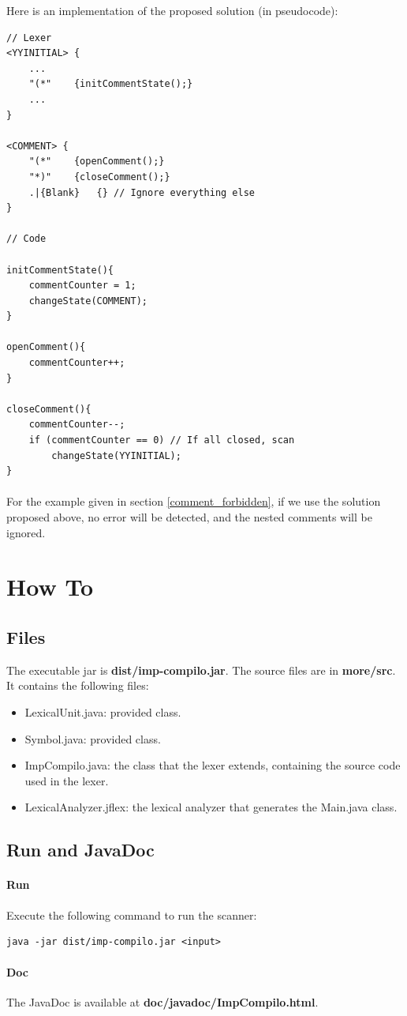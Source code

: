 \documentclass[letterpaper]{article}
\begin{document}
Here is an implementation of the proposed solution (in pseudocode): \\
\begin{lstlisting}[frame=single]
// Lexer
<YYINITIAL> {
    ...
    "(*"    {initCommentState();}
    ...
}

<COMMENT> {
    "(*"    {openComment();}
    "*)"    {closeComment();}
    .|{Blank}   {} // Ignore everything else
}

// Code

initCommentState(){
    commentCounter = 1;
    changeState(COMMENT);
}

openComment(){
    commentCounter++;
}

closeComment(){
    commentCounter--;
    if (commentCounter == 0) // If all closed, scan
        changeState(YYINITIAL);
}

\end{lstlisting}

\paragraph{}
For the example given in section \ref{comment_forbidden}, if we use the
solution proposed above, no error will be detected, and the nested
comments will be ignored.

\section{How To}

\subsection{Files}

The executable jar is \textbf{dist/imp-compilo.jar}.
The source files are in \textbf{more/src}. It contains the following files:

\begin{itemize}
    \item LexicalUnit.java: provided class.
    \item Symbol.java: provided class.
    \item ImpCompilo.java: the class that the lexer extends, containing the
    source code used in the lexer.
    \item LexicalAnalyzer.jflex: the lexical analyzer that generates the
    Main.java class.
\end{itemize}

\subsection{Run and JavaDoc}

\paragraph{Run}
Execute the following command to run the scanner:
\begin{lstlisting}[frame=single]
java -jar dist/imp-compilo.jar <input>
\end{lstlisting}
\paragraph{Doc}

The JavaDoc is available at \textbf{doc/javadoc/ImpCompilo.html}.
\end{document}
